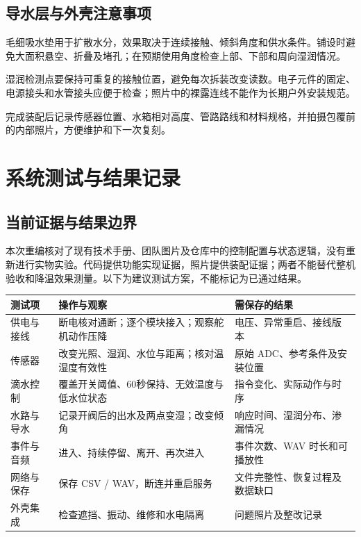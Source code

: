 \documentclass[10pt,a4paper]{article}
\begin{document}
\subsection{导水层与外壳注意事项}

毛细吸水垫用于扩散水分，效果取决于连续接触、倾斜角度和供水条件。铺设时避免大面积悬空、折叠及堵孔；在预期使用角度检查上部、下部和周向湿润情况。


湿润检测点要保持可重复的接触位置，避免每次拆装改变读数。电子元件的固定、电源接头和水管接头应便于检查；照片中的裸露连线不能作为长期户外安装规范。


完成装配后记录传感器位置、水箱相对高度、管路路线和材料规格，并拍摄包覆前的内部照片，方便维护和下一次复刻。


\clearpage
\section{系统测试与结果记录}

\subsection{当前证据与结果边界}

本次重编核对了现有技术手册、团队图片及仓库中的控制配置与状态逻辑，没有重新进行实物实验。代码提供功能实现证据，照片提供装配证据；两者不能替代整机验收和降温效果测量。以下为建议测试方案，不能标记为已通过结果。


\begin{longtable}{p{42mm}p{59mm}p{58mm}}
\toprule
\textbf{测试项} & \textbf{操作与观察} & \textbf{需保存的结果}\\\midrule\endhead
供电与接线 & 断电核对通断；逐个模块接入；观察舵机动作压降 & 电压、异常重启、接线版本\\
传感器 & 改变光照、湿润、水位与距离；核对温湿度有效性 & 原始 ADC、参考条件及安装位置\\
滴水控制 & 覆盖开关阈值、60秒保持、无效温度与低水位状态 & 指令变化、实际动作与时序\\
水路与导水 & 记录开阀后的出水及两点变湿；改变倾角 & 响应时间、湿润分布、渗漏情况\\
事件与音频 & 进入、持续停留、离开、再次进入 & 事件次数、WAV 时长和可播放性\\
网络与保存 & 保存 CSV / WAV，断连并重启服务 & 文件完整性、恢复过程及数据缺口\\
外壳集成 & 检查遮挡、振动、维修和水电隔离 & 问题照片及整改记录\\
\bottomrule\end{longtable}
\end{document}
